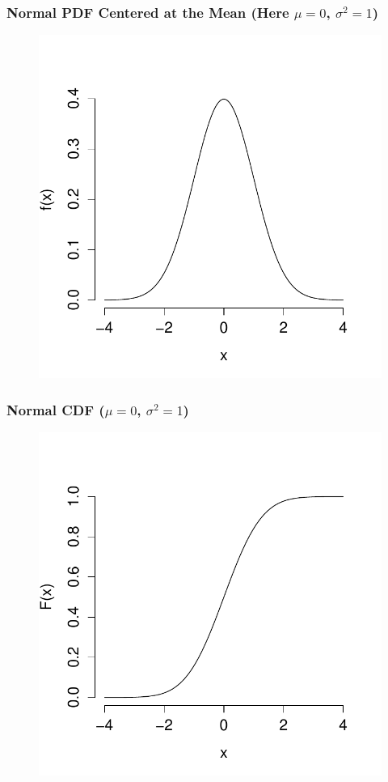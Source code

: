 \documentclass[handout]{beamer}
\begin{document}
\begin{frame}
\frametitle{Normal PDF Centered at the Mean (Here $\mu = 0$, $\sigma^2 = 1$)}

\begin{figure}
\includegraphics[scale = 0.65]{./images/std_normal_PDF}
\end{figure}
\end{frame}




\begin{frame}
\frametitle{Normal CDF ($\mu = 0$, $\sigma^2 = 1$)}

\begin{figure}
\includegraphics[scale = 0.62]{./images/std_normal_CDF}
\end{figure}
\end{frame}
\end{document}
